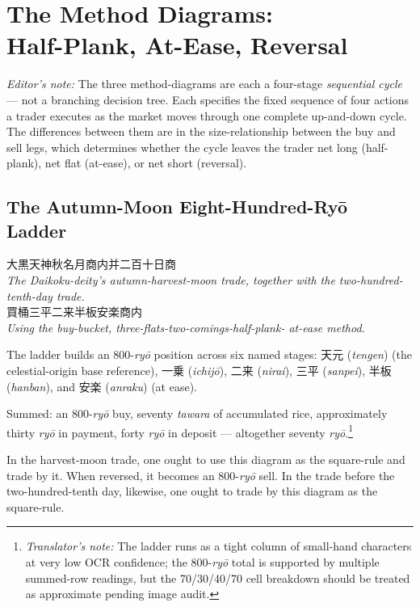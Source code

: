 \documentclass[10pt, openany]{book}
\newcommand{\jp}[1]{{\japanesefont #1}}
\newcommand{\tn}[1]{\footnote{\textit{Translator's note:} #1}}
\newcommand{\jt}[2]{\jp{#1} (\textit{#2})}
\newenvironment{editorialnote}{%
  \begin{editorbox}\small\textit{Editor's note:}\enspace}{\end{editorbox}}
\begin{document}
\chapter{The Method Diagrams:\\ Half-Plank, At-Ease, Reversal}

\begin{editorialnote}
The three method-diagrams are each a four-stage \textit{sequential
cycle} --- not a branching decision tree. Each specifies the fixed
sequence of four actions a trader executes as the market moves
through one complete up-and-down cycle. The differences between
them are in the size-relationship between the buy and sell legs,
which determines whether the cycle leaves the trader net long
(half-plank), net flat (at-ease), or net short (reversal).
\end{editorialnote}

\section{The Autumn-Moon Eight-Hundred-Ry\=o Ladder}

\begin{center}
\jp{大黒天神秋名月商内并二百十日商}\\[0.3em]
\textit{The Daikoku-deity's autumn-harvest-moon trade, together
with the two-hundred-tenth-day trade.}\\[0.4em]
\jp{買桶三平二来半板安楽商内}\\[0.3em]
\textit{Using the buy-bucket, three-flats-two-comings-half-plank-
at-ease method.}
\end{center}

The ladder builds an 800-\textit{ry\=o} position across six named
stages: \jt{天元}{tengen} (the celestial-origin base reference),
\jt{一乗}{ichij\=o}, \jt{二来}{nirai}, \jt{三平}{sanpei},
\jt{半板}{hanban}, and \jt{安楽}{anraku} (at ease).

Summed: an 800-\textit{ry\=o} buy, seventy \textit{tawara} of
accumulated rice, approximately thirty \textit{ry\=o} in payment,
forty \textit{ry\=o} in deposit --- altogether seventy
\textit{ry\=o}.\tn{The ladder runs as a tight column of small-hand
characters at very low OCR confidence; the 800-\textit{ry\=o}
total is supported by multiple summed-row readings, but the
70/30/40/70 cell breakdown should be treated as approximate
pending image audit.}

In the harvest-moon trade, one ought to use this diagram as the
square-rule and trade by it. When reversed, it becomes an
800-\textit{ry\=o} sell. In the trade before the two-hundred-tenth
day, likewise, one ought to trade by this diagram as the
square-rule.
\end{document}
